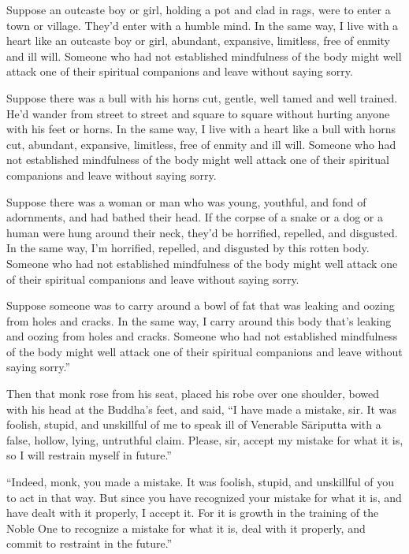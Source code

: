 \documentclass[12pt,openany]{book}%
\begin{document}
Suppose an outcaste boy or girl, holding a pot and clad in rags, were to enter a town or village. They’d enter with a humble mind. In the same way, I live with a heart like an outcaste boy or girl, abundant, expansive, limitless, free of enmity and ill will. Someone who had not established mindfulness of the body might well attack one of their spiritual companions and leave without saying sorry. 

Suppose there was a bull with his horns cut, gentle, well tamed and well trained. He’d wander from street to street and square to square without hurting anyone with his feet or horns. In the same way, I live with a heart like a bull with horns cut, abundant, expansive, limitless, free of enmity and ill will. Someone who had not established mindfulness of the body might well attack one of their spiritual companions and leave without saying sorry. 

Suppose there was a woman or man who was young, youthful, and fond of adornments, and had bathed their head. If the corpse of a snake or a dog or a human were hung around their neck, they’d be horrified, repelled, and disgusted. In the same way, I’m horrified, repelled, and disgusted by this rotten body. Someone who had not established mindfulness of the body might well attack one of their spiritual companions and leave without saying sorry. 

Suppose someone was to carry around a bowl of fat that was leaking and oozing from holes and cracks. In the same way, I carry around this body that’s leaking and oozing from holes and cracks. Someone who had not established mindfulness of the body might well attack one of their spiritual companions and leave without saying sorry.” 

Then that monk rose from his seat, placed his robe over one shoulder, bowed with his head at the Buddha’s feet, and said, “I have made a mistake, sir. It was foolish, stupid, and unskillful of me to speak ill of Venerable \textsanskrit{Sāriputta} with a false, hollow, lying, untruthful claim. Please, sir, accept my mistake for what it is, so I will restrain myself in future.” 

“Indeed, monk, you made a mistake. It was foolish, stupid, and unskillful of you to act in that way. But since you have recognized your mistake for what it is, and have dealt with it properly, I accept it. For it is growth in the training of the Noble One to recognize a mistake for what it is, deal with it properly, and commit to restraint in the future.” 
\end{document}
